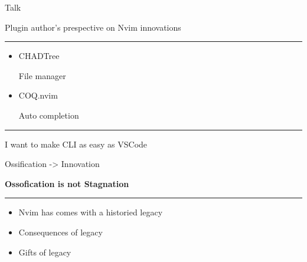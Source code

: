 \documentclass{beamer}
\begin{document}
\begin{frame}{Talk}

	Plugin author's prespective on Nvim innovations

	\rule{\textwidth}{0.1em}

	\begin{itemize}

		\item CHADTree

		      File manager

		      \hspace{0.1em}

		\item COQ.nvim

		      Auto completion

	\end{itemize}

	\rule{\textwidth}{0.1em}

	I want to make CLI as easy as VSCode

\end{frame}


\begin{frame}{Ossification -> Innovation}

	\textbf{Ossofication is not Stagnation}

	\rule{\textwidth}{0.1em}

	\begin{itemize}

		\item Nvim has comes with a historied legacy

		\item Consequences of legacy

		\item Gifts of legacy

	\end{itemize}

\end{frame}
\end{document}
